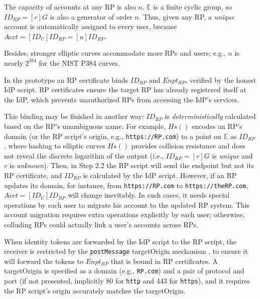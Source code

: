 The capacity of accounts at any RP is also $n$.
$\mathbb{E}$ is a finite cyclic group,
    so $ID_{RP} = [r]G$ is also a generator of order $n$.
Thus, given any RP,
    a \emph{unique} account is automatically assigned to every user,
        because $Acct =  [ID_U]ID_{RP} = [u]ID_{RP}$.

Besides, stronger elliptic curves accommodate more RPs and users;
e.g., $n$ is nearly $2^{384}$ for the NIST P384 curves.


\vspace{0.4mm}
In the prototype an RP certificate binds $ID_{RP}$ and $Enpt_{RP}$,
    verified by the honest IdP script.
RP certificates ensure the target RP has already registered itself at the IdP,
 which prevents unauthorized RPs from accessing the IdP's services.

This binding may be finished in another way:
    $ID_{RP}$ is \emph{deterministically} calculated based on the RP's unambiguous name.
For example, $Hs()$ encodes an RP's domain (or the RP script's origin, e.g., \verb+https://RP.com+) to a point on $\mathbb{E}$ as $ID_{RP}$,
where
    hashing to elliptic curves $Hs()$ \cite{irtf-cfrg-hash-to-curve-16} provides collision resistance and does not reveal the discrete logarithm of the output
    (i.e., $ID_{RP} = [r]G$ is \emph{unique} and $r$ is \emph{unknown}).
Then,  in Step 2.2 the RP script will send the endpoint but not its RP certificate,
 and $ID_{RP}$ is calculated by the IdP script.
However, if an RP updates its domain, for instance, from \verb+https://RP.com+ to \verb+https://theRP.com+,
$Acct = [ID_U]ID_{RP}$ will change inevitably.
In such cases,
    it needs special operations by each user to migrate his account
            to the updated RP system.
This account migration requires extra operations explicitly by each user;
    otherwise,
        colluding RPs could actually link a user's accounts across RPs.

\vspace{0.4mm}
When identity tokens are forwarded by the IdP script to the RP script, %
    the receiver is restricted by the \verb+postMessage+ targetOrigin mechanism \cite{postm-targeto},
        to ensure it will forward the tokens to $Enpt_{RP}$
        that is bound in RP certificates.
A targetOrigin is specified as
    a domain (e.g., \verb+RP.com+) and a pair of protocol and port (if not presented, implicitly 80 for \verb+http+ and 443 for \verb+https+),
        and it requires the RP script's origin accurately matches the targetOrigin.

